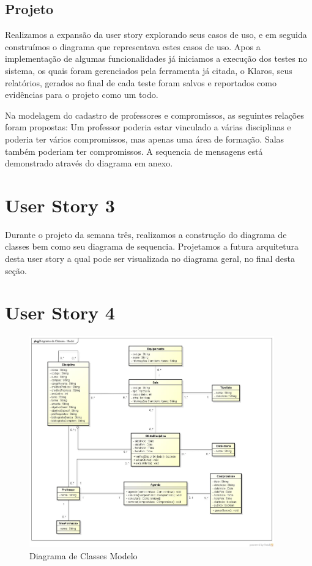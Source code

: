\documentclass{abnt}
\begin{document}
	\subsection{Projeto}
	Realizamos a expansão da user story explorando seus casos de uso, e em seguida construímos o diagrama que representava estes casos de uso.
	Apos a implementação de algumas funcionalidades já iniciamos a execução dos testes no sistema, os quais foram gerenciados pela ferramenta já citada, o Klaros, seus relatórios, gerados ao final de cada teste foram salvos e reportados como evidências para o projeto como um todo. 
	
	Na modelagem do cadastro de professores e compromissos, as seguintes relações foram propostas:
	Um professor poderia estar vinculado a várias disciplinas e poderia ter vários compromissos, mas apenas uma área de formação.
	Salas também poderiam ter compromissos.
	A sequencia de mensagens está demonstrado através do diagrama em anexo.
	
	\section{User Story 3}
	
	Durante o projeto da semana três, realizamos a construção do diagrama de classes bem como seu diagrama de sequencia.
	Projetamos a futura arquitetura desta user story a qual pode ser visualizada no diagrama geral, no final desta seção. 
	
	\section{User Story 4}
	
	
		\begin{figure}[h]
			\begin{center}
				 \includegraphics[width=400px]{classesmodelo}
				 \caption[labelInTOC]{Diagrama de Classes Modelo}
				 \label{fig:diagramaClassesModelo}
			\end{center}
		\end{figure}
		\FloatBarrier
\end{document}
